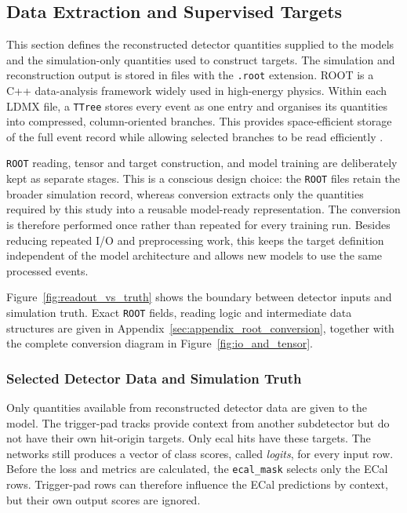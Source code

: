 \subsection{Data Extraction and Supervised Targets}
\label{sec:method_processing}

This section defines the reconstructed detector quantities supplied to the
models and the simulation-only quantities used to construct targets. The
simulation and reconstruction output is stored in files with the
\texttt{.root} extension. ROOT is a C++ data-analysis framework widely used in
high-energy physics. Within each LDMX file, a \texttt{TTree} stores every
event as one entry and organises its quantities into compressed,
column-oriented branches. This provides space-efficient storage of the full
event record while allowing selected branches to be read efficiently
\cite{ROOT_NIMA_1997,root_about,root_ttree}.

\texttt{ROOT} reading, tensor and target construction, and model training are
deliberately kept as separate stages. This is a conscious design choice: the
\texttt{ROOT} files retain the broader simulation record, whereas conversion
extracts only the quantities required by this study into a reusable
model-ready representation. The conversion is therefore performed once rather
than repeated for every training run. Besides reducing repeated I/O and
preprocessing work, this keeps the target definition independent of the model
architecture and allows new models to use the same processed events.

Figure~\ref{fig:readout_vs_truth} shows the boundary between detector inputs
and simulation truth. Exact \texttt{ROOT} fields, reading logic and
intermediate data structures are given in
Appendix~\ref{sec:appendix_root_conversion}, together with the complete
conversion diagram in Figure~\ref{fig:io_and_tensor}.



\subsubsection{Selected Detector Data and Simulation Truth}

Only quantities available from reconstructed detector data are given to the
model. 
The trigger-pad tracks provide context from another subdetector but do not
have their own hit-origin targets. Only \gls{ecal} hits have these targets.
The networks still produces a vector of class scores, called
\textit{logits}, for every input row. Before the loss and metrics are
calculated, the \texttt{ecal\_mask} selects only the ECal rows. Trigger-pad
rows can therefore influence the ECal predictions by context, but their own output
scores are ignored.

